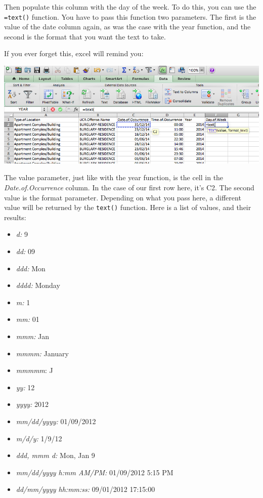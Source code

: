 \documentclass[]{book}
\providecommand{\tightlist}{%
  \setlength{\itemsep}{0pt}\setlength{\parskip}{0pt}}
\theoremstyle{definition}
\theoremstyle{definition}
\theoremstyle{definition}
\theoremstyle{remark}
\begin{document}
Then populate this column with the day of the week. To do this, you can
use the \texttt{=text()} function. You have to pass this function two
parameters. The first is the value of the date column again, as was the
case with the year function, and the second is the format that you want
the text to take.

If you ever forget this, excel will remind you:

\includegraphics{imgs/text_params.png}

The value parameter, just like with the year function, is the cell in
the \emph{Date.of.Occurrence} column. In the case of our first row here,
it's C2. The second value is the format parameter. Depending on what you
pass here, a different value will be returned by the \texttt{text()}
function. Here is a list of values, and their results:

\begin{itemize}
\tightlist
\item
  \emph{d:} 9
\item
  \emph{dd:} 09
\item
  \emph{ddd:} Mon
\item
  \emph{dddd:} Monday
\item
  \emph{m:} 1
\item
  \emph{mm:} 01
\item
  \emph{mmm:} Jan
\item
  \emph{mmmm:} January
\item
  \emph{mmmmm}: J
\item
  \emph{yy:} 12
\item
  \emph{yyyy:} 2012
\item
  \emph{mm/dd/yyyy:} 01/09/2012
\item
  \emph{m/d/y:} 1/9/12
\item
  \emph{ddd, mmm d:} Mon, Jan 9
\item
  \emph{mm/dd/yyyy h:mm AM/PM:} 01/09/2012 5:15 PM
\item
  \emph{dd/mm/yyyy hh:mm:ss:} 09/01/2012 17:15:00
\end{itemize}
\end{document}
